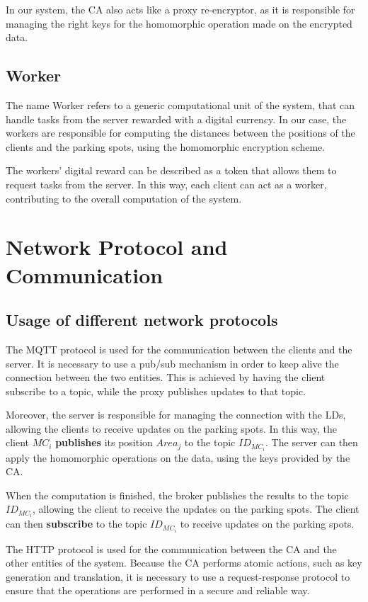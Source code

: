 In our system, the CA also acts like a proxy re-encryptor\cite{POLYAKOV2017FastPRE}, as it is responsible for managing the right keys for the homomorphic operation made on the encrypted data. 

\subsection{Worker}
The name Worker refers to a generic computational unit of the system, that can handle tasks from the server rewarded with a digital currency. In our case, the workers are responsible for computing the distances between the positions of the clients and the parking spots, using the homomorphic encryption scheme. 

The workers' digital reward can be described as a token that allows them to request tasks from the server. In this way, each client can act as a worker, contributing to the overall computation of the system.

\section{Network Protocol and Communication}
\subsection{Usage of different network protocols}

The MQTT protocol is used for the communication between the clients and the server. It is necessary to use a pub/sub mechanism in order to keep alive the connection between the two entities. This is achieved by having the client subscribe to a topic, while the proxy publishes updates to that topic.

Moreover, the server is responsible for managing the connection with the LDs, allowing the clients to receive updates on the parking spots. In this way, the client $MC_i$ \textbf{publishes} its position $Area_j$ to the topic $ID_{MC_i}$. The server can then apply the homomorphic operations on the data, using the keys provided by the CA.

When the computation is finished, the broker publishes the results to the topic $ID_{MC_i}$, allowing the client to receive the updates on the parking spots. The client can then \textbf{subscribe} to the topic $ID_{MC_i}$ to receive updates on the parking spots.

The HTTP protocol is used for the communication between the CA and the other entities of the system. Because the CA performs atomic actions, such as key generation and translation, it is necessary to use a request-response protocol to ensure that the operations are performed in a secure and reliable way.

